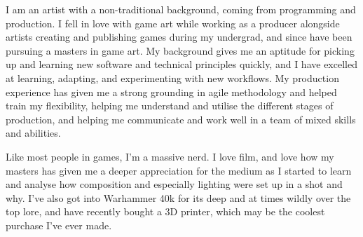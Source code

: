

\begin{cvparagraph}
    I am an artist with a non-traditional background, coming from programming and production. I fell in love with game art while working as a producer alongside artists creating and publishing games during my undergrad, and since have been pursuing a masters in game art. My background gives me an aptitude for picking up and learning new software and technical principles quickly, and I have excelled at learning, adapting, and experimenting with new workflows. My production experience has given me a strong grounding in agile methodology and helped train my flexibility, helping me understand and utilise the different stages of production, and helping me communicate and work well in a team of mixed skills and abilities.

    Like most people in games, I'm a massive nerd. I love film, and love how my masters has given me a deeper appreciation for the medium as I started to learn and analyse how composition and especially lighting were set up in a shot and why. I've also got into Warhammer 40k for its deep and at times wildly over the top lore, and have recently bought a 3D printer, which may be the coolest purchase I've ever made.
\end{cvparagraph}